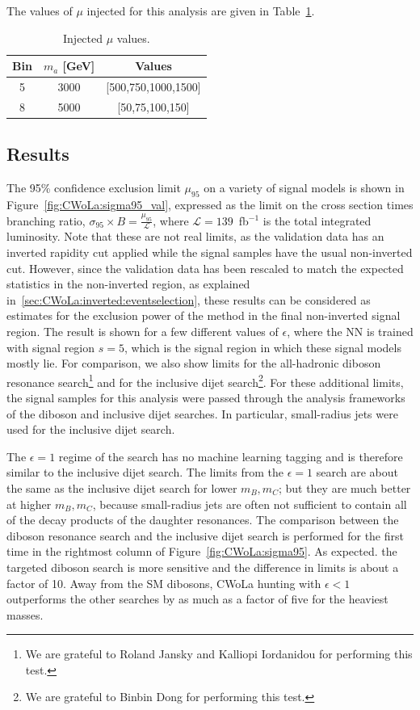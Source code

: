 The values of $\mu$ injected for this analysis are given in Table~\ref{tab:inverted:injectedmu}.

\begin{table}[htb]
  \centering
  \caption{Injected $\mu$ values.}
  \label{tab:inverted:injectedmu}
  \begin{tabular}{c c c}
    \hline
    Bin & $m_a$ [GeV] & Values \\ \hline
    5 & 3000 & [500,750,1000,1500] \\
    8 & 5000 & [50,75,100,150] \\
    \hline
  \end{tabular}
\end{table} 

\subsection{Results}
The 95\% confidence exclusion limit $\mu_{95}$ on a variety of signal models is shown in Figure~\ref{fig:CWoLa:sigma95_val}, expressed as the limit on the cross section times branching ratio, $\sigma_{95}\times B = \frac{\mu_{95}}{\mathcal{L}}$, where $\mathcal{L} = 139$~fb$^{-1}$ is the total integrated luminosity.
Note that these are not real limits, as the validation data has an inverted rapidity cut applied while the signal samples have the usual non-inverted cut.
However, since the validation data has been rescaled to match the expected statistics in the non-inverted region, as explained in~\ref{sec:CWoLa:inverted:eventselection}, these results can be considered as estimates for the exclusion power of the method in the final non-inverted signal region.
The result is shown for a few different values of $\epsilon$, where the NN is trained with signal region $s=5$, which is the signal region in which these signal models mostly lie.
For comparison, we also show limits for the all-hadronic diboson resonance search\footnote{We are grateful to Roland Jansky and Kalliopi Iordanidou for performing this test.} and for the inclusive dijet search\footnote{We are grateful to Binbin Dong for performing this test.}.
For these additional limits, the signal samples for this analysis were passed through the analysis frameworks of the diboson and inclusive dijet searches.
In particular, small-radius jets were used for the inclusive dijet search.

The $\epsilon=1$ regime of the search has no machine learning tagging and is therefore similar to the inclusive dijet search.
The limits from the $\epsilon=1$ search are about the same as the inclusive dijet search for lower $m_B,m_C$; but they are much better at higher $m_B,m_C$, because small-radius jets are often not sufficient to contain all of the decay products of the daughter resonances.
The comparison between the diboson resonance search and the inclusive dijet search is performed for the first time in the rightmost column of Figure~\ref{fig:CWoLa:sigma95}.
As expected. the targeted diboson search is more sensitive and the difference in limits is about a factor of 10.
Away from the SM dibosons, CWoLa hunting with $\epsilon<1$ outperforms the other searches by as much as a factor of five for the heaviest masses.

